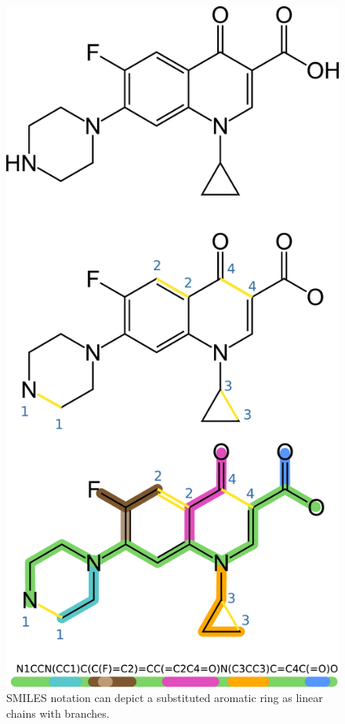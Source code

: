 \begin{figure}[hbtp]
	\begin{center}
	\includegraphics[height=0.9\textheight]{./figures/02/smiles.pdf}
	\end{center}
	\cprotect\caption[SMILES notation]{SMILES notation can depict a substituted aromatic ring as linear chains with branches.}
	\label{fig:smiles}
\end{figure}

